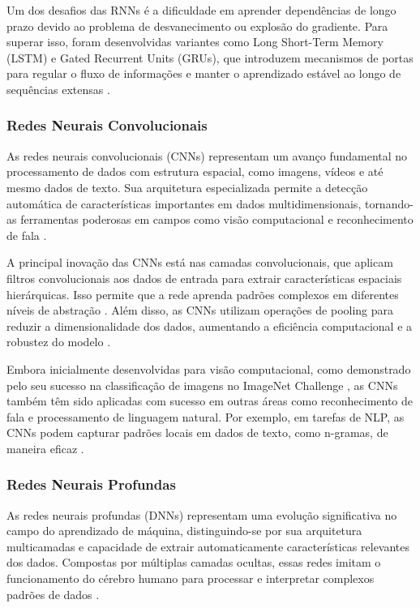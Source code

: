 \documentclass[conference]{IEEEtran}
\begin{document}
Um dos desafios das RNNs é a dificuldade em aprender dependências de longo prazo devido ao 
problema de desvanecimento ou explosão do gradiente. 
Para superar isso, foram desenvolvidas variantes como Long Short-Term Memory (LSTM) e 
Gated Recurrent Units (GRUs), que introduzem mecanismos de portas para regular o fluxo de 
informações e manter o aprendizado estável ao longo de sequências extensas \cite{Hochreiter1997, Cho2014}.



\subsubsection{Redes Neurais Convolucionais} As redes neurais convolucionais (CNNs) representam um avanço 
fundamental no processamento de dados com estrutura espacial, como imagens, vídeos e até mesmo dados de texto. 
Sua arquitetura especializada permite a detecção automática de características importantes em dados 
multidimensionais, tornando-as ferramentas poderosas em campos como 
visão computacional e reconhecimento de fala \cite{LeCun2015}.

A principal inovação das CNNs está nas camadas convolucionais, que aplicam filtros convolucionais 
aos dados de entrada para extrair características espaciais hierárquicas. 
Isso permite que a rede aprenda padrões complexos em diferentes níveis de abstração \cite{Krizhevsky2012}. 
Além disso, as CNNs utilizam operações de pooling para reduzir a dimensionalidade dos dados, 
aumentando a eficiência computacional e a robustez do modelo \cite{Goodfellow2016}.

Embora inicialmente desenvolvidas para visão computacional, como demonstrado pelo seu sucesso na 
classificação de imagens no ImageNet Challenge \cite{Russakovsky2015}, as CNNs também têm sido aplicadas 
com sucesso em outras áreas como reconhecimento de fala e processamento de linguagem natural. 
Por exemplo, em tarefas de NLP, as CNNs podem capturar padrões locais em dados de texto, 
como n-gramas, de maneira eficaz \cite{Kim2014}.



\subsubsection{Redes Neurais Profundas} As redes neurais profundas (DNNs) representam uma evolução 
significativa no campo do aprendizado de máquina, distinguindo-se por sua arquitetura multicamadas 
e capacidade de extrair automaticamente características relevantes dos dados. 
Compostas por múltiplas camadas ocultas, essas redes imitam o funcionamento do cérebro humano para 
processar e interpretar complexos padrões de dados \cite{LeCun2015}.
\end{document}

